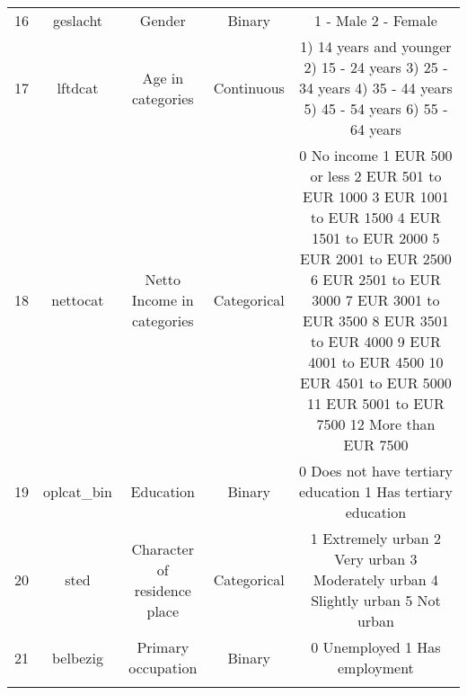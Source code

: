 \begin{table}[!htbp]
\begin{tabular}{@{\extracolsep{5pt}} ccccc}
16 & geslacht & Gender & Binary & 1 - Male 2 - Female \\ 
17 & lftdcat & Age in categories & Continuous & 1) 14 years and younger 2) 15 - 24 years 3) 25 - 34 years 4) 35 - 44 years 5) 45 - 54 years 6) 55 - 64 years \\ 
18 & nettocat & Netto Income in categories & Categorical & 0 No income 1 EUR 500 or less 2 EUR 501 to EUR 1000 3 EUR 1001 to EUR 1500 4 EUR 1501 to EUR 2000 5 EUR 2001 to EUR 2500 6 EUR 2501 to EUR 3000 7 EUR 3001 to EUR 3500 8 EUR 3501 to EUR 4000 9 EUR 4001 to EUR 4500 10 EUR 4501 to EUR 5000 11 EUR 5001 to EUR 7500 12 More than EUR 7500 \\ 
19 & oplcat\_bin & Education & Binary & 0 Does not have tertiary education 1 Has tertiary education \\ 
20 & sted & Character of residence place & Categorical & 1 Extremely urban 2 Very urban 3 Moderately urban 4 Slightly urban 5 Not urban \\ 
21 & belbezig & Primary occupation & Binary & 0 Unemployed 1 Has employment \\ 
\hline \\[-1.8ex] 
\end{tabular} 
\end{table} 
